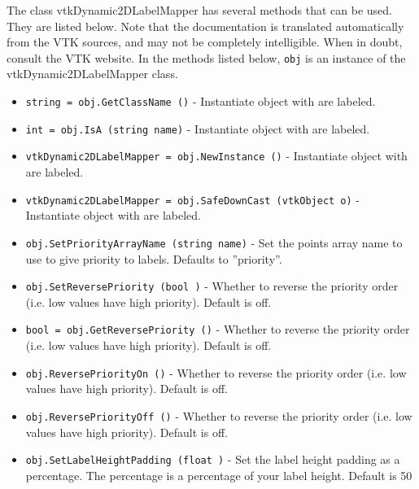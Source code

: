 The class vtkDynamic2DLabelMapper has several methods that can be used.
  They are listed below.
Note that the documentation is translated automatically from the VTK sources,
and may not be completely intelligible.  When in doubt, consult the VTK website.
In the methods listed below, \verb|obj| is an instance of the vtkDynamic2DLabelMapper class.
\begin{itemize}
\item  \verb|string = obj.GetClassName ()| -  Instantiate object with %
 are labeled.

\item  \verb|int = obj.IsA (string name)| -  Instantiate object with %
 are labeled.

\item  \verb|vtkDynamic2DLabelMapper = obj.NewInstance ()| -  Instantiate object with %
 are labeled.

\item  \verb|vtkDynamic2DLabelMapper = obj.SafeDownCast (vtkObject o)| -  Instantiate object with %
 are labeled.

\item  \verb|obj.SetPriorityArrayName (string name)| -  Set the points array name to use to give priority to labels.
 Defaults to ''priority''.

\item  \verb|obj.SetReversePriority (bool )| -  Whether to reverse the priority order (i.e. low values have high priority).
 Default is off.

\item  \verb|bool = obj.GetReversePriority ()| -  Whether to reverse the priority order (i.e. low values have high priority).
 Default is off.

\item  \verb|obj.ReversePriorityOn ()| -  Whether to reverse the priority order (i.e. low values have high priority).
 Default is off.

\item  \verb|obj.ReversePriorityOff ()| -  Whether to reverse the priority order (i.e. low values have high priority).
 Default is off.

\item  \verb|obj.SetLabelHeightPadding (float )| -  Set the label height padding as a percentage. The percentage 
 is a percentage of your label height. 
 Default is 50%


\end{itemize}
